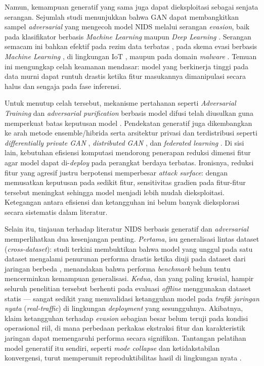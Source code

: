 \documentclass[11pt, a4paper]{article}
\begin{document}
Namun, kemampuan generatif yang sama juga dapat dieksploitasi sebagai senjata serangan. Sejumlah studi menunjukkan bahwa GAN dapat membangkitkan sampel \textit{adversarial} yang mengecoh model NIDS melalui serangan \textit{evasion}, baik pada klasifikator berbasis \textit{Machine Learning} maupun \textit{Deep Learning} \cite{ref_attackgan, ref_sganids, ref_idsgan}. Serangan semacam ini bahkan efektif pada rezim data terbatas \cite{ref_evasiongan}, pada skema evasi berbasis \textit{Machine Learning} \cite{ref_demgan}, di lingkungan IoT \cite{ref_iotevasion}, maupun pada domain \textit{malware} \cite{ref_aagan, ref_gleam}. Temuan ini mengungkap celah keamanan mendasar: model yang berkinerja tinggi pada data murni dapat runtuh drastis ketika fitur masukannya dimanipulasi secara halus dan sengaja pada fase inferensi.

Untuk menutup celah tersebut, mekanisme pertahanan seperti \textit{Adversarial Training} dan \textit{adversarial purification} berbasis model difusi telah diusulkan guna memperkuat batas keputusan model \cite{ref_diffpurif}. Pendekatan generatif juga dikembangkan ke arah metode ensemble/hibrida \cite{ref_ewgan, ref_hybridwgan} serta arsitektur privasi dan terdistribusi seperti \textit{differentially private GAN} \cite{ref_hegan}, \textit{distributed GAN} \cite{ref_distgan}, dan \textit{federated learning} \cite{ref_nidsfgpa}. Di sisi lain, kebutuhan efisiensi komputasi mendorong penerapan reduksi dimensi fitur agar model dapat di-\textit{deploy} pada perangkat berdaya terbatas. Ironisnya, reduksi fitur yang agresif justru berpotensi memperbesar \textit{attack surface}: dengan memusatkan keputusan pada sedikit fitur, sensitivitas gradien pada fitur-fitur tersebut meningkat sehingga model menjadi lebih mudah dieksploitasi. Ketegangan antara efisiensi dan ketangguhan ini belum banyak dieksplorasi secara sistematis dalam literatur.

Selain itu, tinjauan terhadap literatur NIDS berbasis generatif dan \textit{adversarial} memperlihatkan dua kesenjangan penting. \textit{Pertama}, isu generalisasi lintas dataset (\textit{cross-dataset}): studi terkini membuktikan bahwa model yang unggul pada satu dataset mengalami penurunan performa drastis ketika diuji pada dataset dari jaringan berbeda \cite{ref_crossgen, ref_synthtraffic}, menandakan bahwa performa \textit{benchmark} belum tentu mencerminkan kemampuan generalisasi. \textit{Kedua}, dan yang paling krusial, hampir seluruh penelitian tersebut berhenti pada evaluasi \textit{offline} menggunakan dataset statis --- sangat sedikit yang memvalidasi ketangguhan model pada \textit{trafik jaringan nyata} (\textit{real-traffic}) di lingkungan \textit{deployment} yang sesungguhnya. Akibatnya, klaim ketangguhan terhadap \textit{evasion} sebagian besar belum teruji pada kondisi operasional riil, di mana perbedaan perkakas ekstraksi fitur dan karakteristik jaringan dapat memengaruhi performa secara signifikan. Tantangan pelatihan model generatif itu sendiri, seperti \textit{mode collapse} dan ketidakstabilan konvergensi, turut memperumit reproduktibilitas hasil di lingkungan nyata \cite{ref_challenges}.
\end{document}
